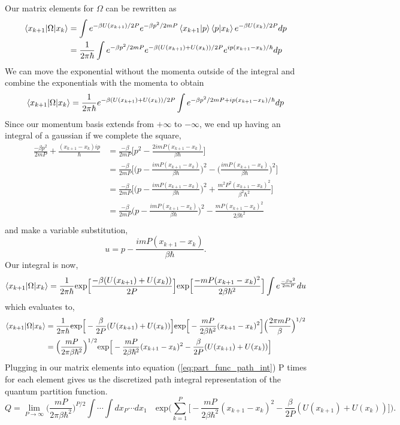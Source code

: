 \documentclass{article}
\newcommand{\be}{\begin{equation}}
\newcommand{\ee}{\end{equation}}
\begin{document}
Our matrix elements for $\Omega$ can be rewritten as
\be
  \begin{split}
    \braket{x_{k+1}|\Omega|x_k} &= \int e^{-\beta U(x_{k+1})/2P} e^{-\beta p^2/2mP} \braket{x_{k+1}|p}\braket{p|x_k} e^{-\beta U(x_k)/2P} dp \\
    &= \frac{1}{2 \pi \hbar} \int e^{-\beta p^2/2mP} e^{-\beta(U(x_{k+1}) + U(x_k))/2P} e^{ip(x_{k+1} - x_k)/\hbar} dp
  \end{split}
\ee
We can move the exponential without the momenta outside of the integral and combine the exponentials with the momenta to obtain
\be
  \braket{x_{k+1}|\Omega|x_k} = \frac{1}{2 \pi \hbar} e^{-\beta(U(x_{k+1}) + U(x_k))/2P} \int e^{-\beta p^2/2mP + ip(x_{k+1} - x_k)/\hbar} dp
\ee
Since our momentum basis extends from $+ \infty$ to $- \infty$, we end up having an integral of a gaussian if we complete the square,
\be
  \begin{split}
    \frac{- \beta p^2}{2mP} + \frac{(x_{k+1} - x_k)ip}{\hbar} &= \frac{- \beta}{2mP} \Big[ p^2 - \frac{2imP(x_{k+1} - x_k)}{\beta \hbar} \Big] \\
    &= \frac{- \beta}{2mP} \Big[ \Big( p -  \frac{imP(x_{k+1} - x_k)}{\beta \hbar} \Big)^2 - \Big( \frac{imP(x_{k+1} - x_k)}{\beta \hbar} \Big)^2 \Big] \\
    &= \frac{- \beta}{2mP} \Big[ \Big( p -  \frac{imP(x_{k+1} - x_k)}{\beta \hbar} \Big)^2 + \frac{m^2P^2(x_{k+1} - x_k)^2}{\beta^2 \hbar^2} \Big] \\
    &= \frac{- \beta}{2mP} \Big( p -  \frac{imP(x_{k+1} - x_k)}{\beta \hbar} \Big)^2 - \frac{mP(x_{k+1} - x_k)^2}{2 \beta \hbar^2} \\
  \end{split}
\ee
and make a variable substitution,
\be
  u = p -  \frac{imP(x_{k+1} - x_k)}{\beta \hbar} .
\ee
Our integral is now,
\be
  \braket{x_{k+1}|\Omega|x_k} = \frac{1}{2 \pi \hbar} \text{exp} \Big[ \frac{-\beta(U(x_{k+1}) + U(x_k))}{2P} \Big] \text{exp} \Big[ \frac{-mP(x_{k+1} - x_k)^2}{2 \beta \hbar^2} \Big] \int e^\frac{-\beta u^2}{2mP} du
\ee
which evaluates to,
\be
  \begin{split}
    \braket{x_{k+1}|\Omega|x_k} &= \frac{1}{2 \pi \hbar} \text{exp} \Big[ -\frac{\beta}{2P}(U(x_{k+1}) + U(x_k)) \Big] \text{exp} \Big[ -\frac{mP}{2 \beta \hbar^2}(x_{k+1} - x_k)^2 \Big] \Big( \frac{2 \pi m P}{\beta} \Big)^{1/2} \\
    &= \Big( \frac{mP}{2 \pi \beta \hbar^2} \Big)^{1/2} \text{exp} \Big[ - \frac{mP}{2 \beta \hbar^2}(x_{k+1} - x_k)^2 - \frac{\beta}{2P}(U(x_{k+1}) + U(x_k)) \Big]
  \end{split}
\ee
Plugging in our matrix elements into equation (\ref{eq:part_func_path_int}) P times for each element gives us the discretized path integral representation of the quantum partition function.
\be \label{eq:part_func_with_omega}
  Q = \lim_{P \to\infty} \Big( \frac{mP}{2 \pi \beta \hbar^2} \Big)^{P/2} \int \cdots \int dx_P \cdots dx_1 \quad \text{exp}\Big( \sum_{k=1}^P \Big[ - \frac{mP}{2 \beta \hbar^2}(x_{k+1} - x_k)^2 - \frac{\beta}{2P}(U(x_{k+1}) + U(x_k)) \Big] \Big) .
\ee
\end{document}
